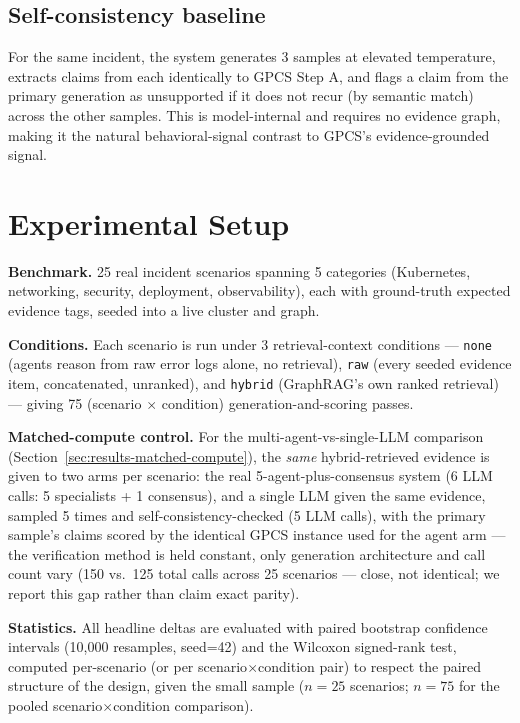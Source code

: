 \documentclass{article}
\begin{document}
\subsection{Self-consistency baseline}
\label{sec:selfconsistency}

For the same incident, the system generates 3 samples at elevated
temperature, extracts claims from each identically to GPCS Step A, and
flags a claim from the primary generation as unsupported if it does not
recur (by semantic match) across the other samples. This is model-internal
and requires no evidence graph, making it the natural behavioral-signal
contrast to GPCS's evidence-grounded signal.

\section{Experimental Setup}
\label{sec:setup}

\textbf{Benchmark.} 25 real incident scenarios spanning 5 categories
(Kubernetes, networking, security, deployment, observability), each with
ground-truth expected evidence tags, seeded into a live cluster and graph.

\textbf{Conditions.} Each scenario is run under 3 retrieval-context
conditions --- \texttt{none} (agents reason from raw error logs alone, no
retrieval), \texttt{raw} (every seeded evidence item, concatenated,
unranked), and \texttt{hybrid} (GraphRAG's own ranked retrieval) --- giving
75 (scenario $\times$ condition) generation-and-scoring passes.

\textbf{Matched-compute control.} For the multi-agent-vs-single-LLM
comparison (Section~\ref{sec:results-matched-compute}), the \emph{same}
hybrid-retrieved evidence is given to two arms per scenario: the real
5-agent-plus-consensus system (6 LLM calls: 5 specialists + 1 consensus),
and a single LLM given the same evidence, sampled 5 times and
self-consistency-checked (5 LLM calls), with the primary sample's claims
scored by the identical GPCS instance used for the agent arm --- the
verification method is held constant, only generation architecture and
call count vary (150 vs.\ 125 total calls across 25 scenarios --- close,
not identical; we report this gap rather than claim exact parity).

\textbf{Statistics.} All headline deltas are evaluated with paired
bootstrap confidence intervals (10{,}000 resamples, seed=42) and the
Wilcoxon signed-rank test, computed per-scenario (or per
scenario$\times$condition pair) to respect the paired structure of the
design, given the small sample ($n=25$ scenarios; $n=75$ for the pooled
scenario$\times$condition comparison).
\end{document}
